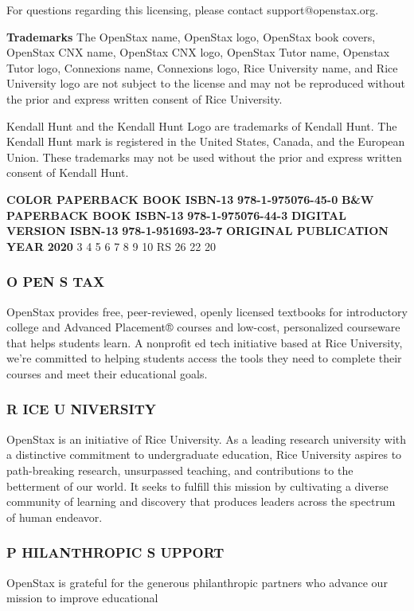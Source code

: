 \documentclass[11pt]{article}
\begin{document}
For questions regarding this licensing, please contact support@openstax.org.

\textbf{Trademarks } The OpenStax name, OpenStax logo, OpenStax book covers, OpenStax CNX name, OpenStax CNX logo,  OpenStax Tutor name, Openstax Tutor logo, Connexions name, Connexions logo, Rice University name, and  Rice University logo are not subject to the license and may not be reproduced without the prior and express  written consent of Rice University.

Kendall Hunt and the Kendall Hunt Logo are trademarks of Kendall Hunt. The Kendall Hunt mark is registered  in the United States, Canada, and the European Union. These trademarks may not be used without the prior  and express written consent of Kendall Hunt.

\textbf{COLOR PAPERBACK BOOK ISBN-13 } \textbf{978-1-975076-45-0 } \textbf{B\&W PAPERBACK BOOK ISBN-13 } \textbf{978-1-975076-44-3 } \textbf{DIGITAL VERSION ISBN-13 } \textbf{978-1-951693-23-7 } \textbf{ORIGINAL PUBLICATION YEAR } \textbf{2020 } 3 4 5 6 7 8 9 10 RS 26 22 20



\subsubsection*{\textbf{O} \textbf{PEN} \textbf{S} \textbf{TAX }}
OpenStax provides free, peer-reviewed, openly licensed textbooks for introductory college and Advanced  Placement® courses and low-cost, personalized courseware that helps students learn. A nonprofit ed tech  initiative based at Rice University, we’re committed to helping students access the tools they need to complete  their courses and meet their educational goals.

\subsubsection*{\textbf{R} \textbf{ICE } \textbf{U} \textbf{NIVERSITY }}
OpenStax is an initiative of Rice University. As a leading research university with a distinctive commitment to  undergraduate education, Rice University aspires to path-breaking research, unsurpassed teaching, and  contributions to the betterment of our world. It seeks to fulfill this mission by cultivating a diverse community  of learning and discovery that produces leaders across the spectrum of human endeavor.

\subsubsection*{\textbf{P} \textbf{HILANTHROPIC } \textbf{S} \textbf{UPPORT }}
OpenStax is grateful for the generous philanthropic partners who advance our mission to improve educational
\end{document}
